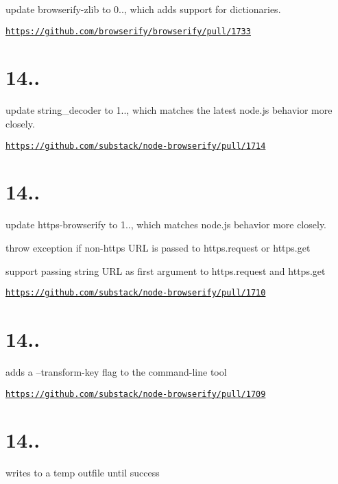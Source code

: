 update {\ttfamily browserify-\/zlib} to 0.., which adds support for dictionaries.

\href{https://github.com/browserify/browserify/pull/1733}{\tt https\+://github.\+com/browserify/browserify/pull/1733}

\section*{14..}

update {\ttfamily string\+\_\+decoder} to 1.., which matches the latest node.\+js behavior more closely.

\href{https://github.com/substack/node-browserify/pull/1714}{\tt https\+://github.\+com/substack/node-\/browserify/pull/1714}

\section*{14..}

update {\ttfamily https-\/browserify} to 1.., which matches node.\+js behavior more closely.


\begin{DoxyItemize}
\item throw exception if non-\/https U\+RL is passed to {\ttfamily https.\+request} or {\ttfamily https.\+get}
\item support passing string U\+RL as first argument to {\ttfamily https.\+request} and {\ttfamily https.\+get}
\end{DoxyItemize}

\href{https://github.com/substack/node-browserify/pull/1710}{\tt https\+://github.\+com/substack/node-\/browserify/pull/1710}

\section*{14..}

adds a --transform-\/key flag to the command-\/line tool

\href{https://github.com/substack/node-browserify/pull/1709}{\tt https\+://github.\+com/substack/node-\/browserify/pull/1709}

\section*{14..}

writes to a temp outfile until success


